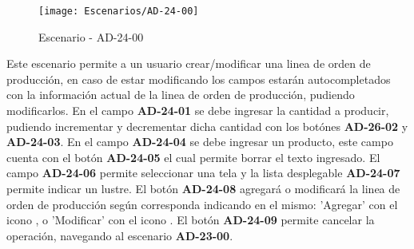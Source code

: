 \begin{figure}[H]
\centering
\texttt{[image: Escenarios/AD-24-00]}
\caption{Escenario - AD-24-00}
\label{fig:AD-24-00}
\end{figure}

Este escenario permite a un usuario crear/modificar una linea de orden de producción, en caso de estar modificando los campos estarán autocompletados con la información actual de la linea de orden de producción, pudiendo modificarlos. En el campo \textbf{AD-24-01} se debe ingresar la cantidad a producir, pudiendo incrementar y decrementar dicha cantidad con los botónes \textbf{AD-26-02} y \textbf{AD-24-03}. En el campo \textbf{AD-24-04} se debe ingresar un producto, este campo cuenta con el botón \textbf{AD-24-05} el cual permite borrar el texto ingresado. El campo \textbf{AD-24-06} permite seleccionar una tela y la lista desplegable \textbf{AD-24-07} permite indicar un lustre. El botón \textbf{AD-24-08} agregará o modificará la linea de orden de producción según corresponda indicando en el mismo: 'Agregar' con el icono \faTimes , o 'Modificar' con el icono \faEdit. 
El botón \textbf{AD-24-09} permite cancelar la operación, navegando al escenario \textbf{AD-23-00}.
\clearpage
